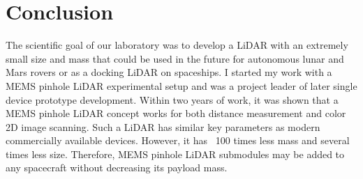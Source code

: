 \chapter{Conclusion}
The scientific goal of our laboratory was to develop a LiDAR with an extremely small size and mass
that could be used in the future for autonomous lunar and Mars rovers or as a docking LiDAR on
spaceships. I started my work with a MEMS pinhole LiDAR experimental setup and was a project
leader of later single device prototype development.
Within two years of work, it was shown that a MEMS pinhole LiDAR concept works for both distance
measurement and color 2D image scanning. Such a LiDAR has similar key parameters as modern
commercially available devices. However, it has ~100 times less mass and several times less size.
Therefore, MEMS pinhole LiDAR submodules may be added to any spacecraft without decreasing its
payload mass.

